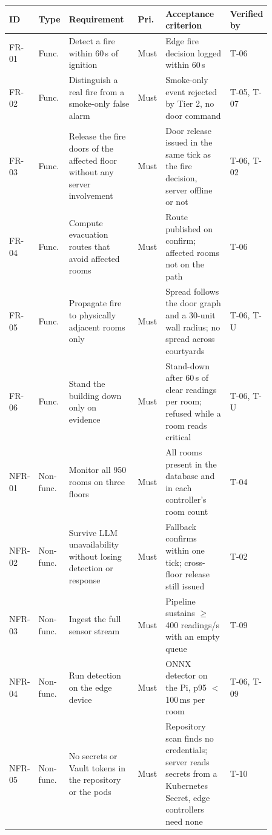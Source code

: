 \documentclass[11pt]{article}
\begin{document}
\begin{longtable}[]{@{}
  >{\raggedright\arraybackslash}p{0.065\linewidth}
  >{\raggedright\arraybackslash}p{0.06\linewidth}
  >{\raggedright\arraybackslash}p{0.29\linewidth}
  >{\raggedright\arraybackslash}p{0.07\linewidth}
  >{\raggedright\arraybackslash}p{0.27\linewidth}
  >{\raggedright\arraybackslash}p{0.105\linewidth}@{}}
\toprule
\textbf{ID} & \textbf{Type} & \textbf{Requirement} & \textbf{Pri.} & \textbf{Acceptance criterion} & \textbf{Verified by} \\
\midrule
\endhead
FR-01 & Func. & Detect a fire within 60\,s of ignition & Must & Edge fire decision logged within 60\,s & T-06 \\
FR-02 & Func. & Distinguish a real fire from a smoke-only false alarm & Must & Smoke-only event rejected by Tier 2, no door command & T-05, T-07 \\
FR-03 & Func. & Release the fire doors of the affected floor without any server involvement & Must & Door release issued in the same tick as the fire decision, server offline or not & T-06, T-02 \\
FR-04 & Func. & Compute evacuation routes that avoid affected rooms & Must & Route published on confirm; affected rooms not on the path & T-06 \\
FR-05 & Func. & Propagate fire to physically adjacent rooms only & Must & Spread follows the door graph and a 30-unit wall radius; no spread across courtyards & T-06, T-U \\
FR-06 & Func. & Stand the building down only on evidence & Must & Stand-down after 60\,s of clear readings per room; refused while a room reads critical & T-06, T-U \\
NFR-01 & Non-func. & Monitor all 950 rooms on three floors & Must & All rooms present in the database and in each controller's room count & T-04 \\
NFR-02 & Non-func. & Survive LLM unavailability without losing detection or response & Must & Fallback confirms within one tick; cross-floor release still issued & T-02 \\
NFR-03 & Non-func. & Ingest the full sensor stream & Must & Pipeline sustains $\geq$400 readings/s with an empty queue & T-09 \\
NFR-04 & Non-func. & Run detection on the edge device & Must & ONNX detector on the Pi, p95 $<$ 100\,ms per room & T-06, T-09 \\
NFR-05 & Non-func. & No secrets or Vault tokens in the repository or the pods & Must & Repository scan finds no credentials; server reads secrets from a Kubernetes Secret, edge controllers need none & T-10 \\

\end{longtable}
\end{document}
